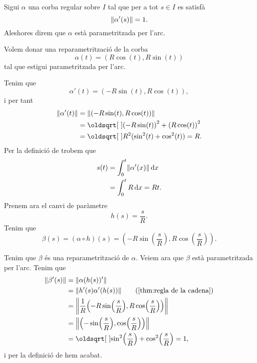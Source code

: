 \documentclass[../../Main.tex]{subfiles}
\begin{document}
	\begin{definition}
		\label{def:corba parametritzada per l'arc}
		Sigui \(\alpha\) una corba regular sobre \(I\) tal que per a tot \(s\in I\) es satisfà
		\[
		    \norm{\alpha'(s)}=1.
		\]
		Aleshores direm que \(\alpha\) està parametritzada per l'arc.
	\end{definition}
	\begin{example} %
		\label{ex:reparametrització per l'arc del cercle de radi R}
		\label{ex:circumferència de radi R parametritzat per l'arc}
		Volem donar una reparametrització de la corba
		\[
		    \alpha(t)=(R\cos(t),R\sin(t))
		\]
		tal que estigui parametritzada per l'arc.
		\begin{solution}
			Tenim que
			\[
			    \alpha'(t)=(-R\sin(t),R\cos(t)),
			\]
			i per tant
			\begin{align*}
				\norm{\alpha'(t)}&=\norm{(-R\sin(t),R\cos(t))} \\
				&=\sqrt{{(-R\sin(t))}^{2}+{(R\cos(t))}^{2}} \\
				&=\sqrt{R^{2}(\sin^{2}(t)+\cos^{2}(t))}=R.
			\end{align*}
			Per la definició de  trobem que
			\begin{align*}
				s(t)&=\int_{0}^{t}\norm{\alpha'(x)}\diff x \\
				&=\int_{0}^{t}R\diff x=Rt.
			\end{align*}
			Prenem ara el canvi de paràmetre
			\[
			    h(s)=\frac{s}{R}.
			\]
			Tenim que
			\[
			    \beta(s)=(\alpha\circ h)(s)=\left(-R\sin\left(\frac{s}{R}\right),R\cos\left(\frac{s}{R}\right)\right).
			\]
			
			Tenim que \(\beta\) és una reparametrització de \(\alpha\). Veiem ara que \(\beta\) està parametritzada per l'arc. Tenim que
			\begin{align*}
				\norm{\beta'(s)}&=\norm{\alpha(h(s))'} \\
				&=\norm{h'(s)\alpha'(h(s))} \tag{\ref{thm:regla de la cadena}}\\
				&=\norm{\frac{1}{R}\left(-R\sin\left(\frac{s}{R}\right),R\cos\left(\frac{s}{R}\right)\right)} \\
				&=\norm{\left(-\sin\left(\frac{s}{R}\right),\cos\left(\frac{s}{R}\right)\right)} \\
				&=\sqrt{\sin^{2}\left(\frac{s}{R}\right)+\cos^{2}\left(\frac{s}{R}\right)}=1,
			\end{align*}
			i per la definició de  hem acabat.
		\end{solution}
	\end{example}
\end{document}

